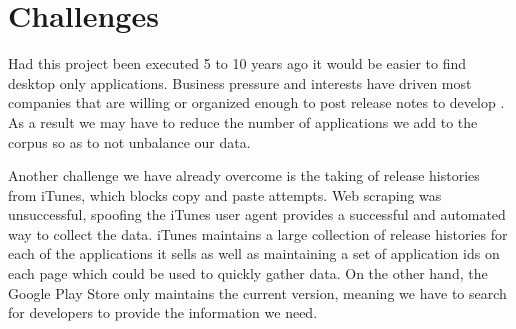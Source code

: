 \documentclass{acm_proc_article-sp}
\begin{document}
\begin{center}

\label{tab:enhancements}
\end{center}

\begin{center}

\label{tab:sumenhance}
\end{center}

\begin{center}

\label{tab:features}
\end{center}

\begin{center}

\label{tab:sumfeatures}
\end{center}


\begin{center}

\label{tab:nonFunc}
\end{center}

\begin{center}

\label{tab:sumNonFunc}
\end{center}

\begin{center}

\label{tab:mobileModel}
\end{center}

\begin{center}

\label{tab:desktopModel}
\end{center}

\begin{center}

\label{tab:sibModel}
\end{center}

\section{Challenges}
Had this project been executed 5 to 10 years ago it would be easier to find desktop only applications. 
Business pressure and interests have driven most companies that are willing or organized enough to post release notes to develop \sibs. 
As a result we may have to reduce the number of applications we add to the corpus so as to not unbalance our data.

Another challenge we have already overcome is the taking of release histories from iTunes, which blocks copy and paste attempts. 
Web scraping was unsuccessful, spoofing the iTunes user agent provides a successful and automated way to collect the data.
iTunes maintains a large collection of release histories for each of the applications it sells as well as maintaining a set of application ids on each page which could be used to quickly gather data.
On the other hand, the Google Play Store only maintains the current version, meaning we have to search for developers to provide the information we need.
\end{document}
